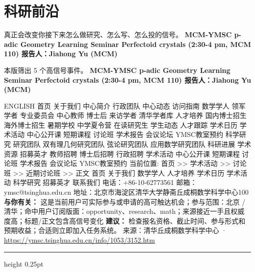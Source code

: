 \documentclass[10.5pt]{ctexart}
\begin{document}
\section*{科研前沿}
{\color{ormuted} 真正会改变你接下来怎么做研究、怎么写、怎么投的信号。}
\vspace{2mm}
{\LARGE\bfseries MCM-YMSC p-adic Geometry Learning Seminar Perfectoid crystals (2:30-4 pm, MCM 110) 报告人：Jiahong Yu (MCM)}\par
\vspace{1mm}
{\color{ormuted} 本版筛出 5 个高信号事件。}
\vspace{3mm}
{\Large\bfseries MCM-YMSC p-adic Geometry Learning Seminar Perfectoid crystals (2:30-4 pm, MCM 110) 报告人：Jiahong Yu (MCM)}\par
ENGLISH 首页 关于我们 中心简介 行政团队 中心动态 访问指南 数学学人 领军学者 专业委员会 中心教师 博士后 来访学者 清华学者库 人才培养 国内博士招生 海外博士招生 暑期学校 中学夏令营 在读研究生 学生动态 人才跟踪 学术日历 学术活动 中心公开课 短期课程 讨论班 学术报告 会议论坛 YMSC教室预约 科学研究 研究团队 双有理几何研究团队 弦论研究团队 应用数学研究团队 科研进展 学术资源 招募英才 教师招聘 博士后招聘 行政招聘 学术活动 中心公开课 短期课程 讨论班 学术报告 会议论坛 YMSC教室预约 当前位置: 首页 >> 学术活动 >> 讨论班 >> 近期讨论班 >> 正文 首页 关于我们 数学学人 人才培养 学术日历 学术活动 科学研究 招募英才 联系我们 电话：+86-10-62773561 邮箱：ymsc@tsinghua.edu.cn 地址：北京市海淀区清华大学静斋丘成桐数学科学中心100
\textbf{与你有关：} 这是当前用户可实际参与或申请的高可触达机会；参与范围：北京 / 清华；命中用户订阅版面：opportunity、research、math；来源接近一手且权威度高；标题/正文包含高信号变化
\textbf{建议：} 检查报名资格、截止时间、参与形式和预期收益；合适则立即加入任务系统。
{\footnotesize\color{ormuted} 来源：清华丘成桐数学科学中心 · \url{https://ymsc.tsinghua.edu.cn/info/1053/3152.htm}}
\vspace{4mm}
\hrule height 0.25pt
\vspace{3mm}
\end{document}
